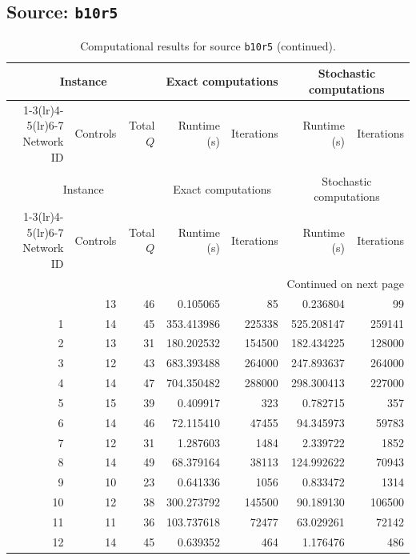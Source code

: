 \documentclass{article}
\begin{document}
\begin{landscape}
\subsection*{Source: \texttt{b10r5}}

\begin{longtable}{rrrrrrr}
\caption{Computational results for source \texttt{b10r5}.}\\
\toprule
\multicolumn{3}{c}{Instance} & \multicolumn{2}{c}{Exact computations} & \multicolumn{2}{c}{Stochastic computations} \\
\cmidrule(lr){1-3}\cmidrule(lr){4-5}\cmidrule(lr){6-7}
Network ID & Controls & Total $Q$ & Runtime (s) & Iterations & Runtime (s) & Iterations \\
\midrule
\endfirsthead
\caption[]{Computational results for source \texttt{b10r5} (continued).}\\
\toprule
\multicolumn{3}{c}{Instance} & \multicolumn{2}{c}{Exact computations} & \multicolumn{2}{c}{Stochastic computations} \\
\cmidrule(lr){1-3}\cmidrule(lr){4-5}\cmidrule(lr){6-7}
Network ID & Controls & Total $Q$ & Runtime (s) & Iterations & Runtime (s) & Iterations \\
\midrule
\endhead
\midrule
\multicolumn{7}{r}{Continued on next page} \\
\endfoot
\bottomrule
\endlastfoot
0 & 13 & 46 & 0.105065 & 85 & 0.236804 & 99 \\
1 & 14 & 45 & 353.413986 & 225338 & 525.208147 & 259141 \\
2 & 13 & 31 & 180.202532 & 154500 & 182.434225 & 128000 \\
3 & 12 & 43 & 683.393488 & 264000 & 247.893637 & 264000 \\
4 & 14 & 47 & 704.350482 & 288000 & 298.300413 & 227000 \\
5 & 15 & 39 & 0.409917 & 323 & 0.782715 & 357 \\
6 & 14 & 46 & 72.115410 & 47455 & 94.345973 & 59783 \\
7 & 12 & 31 & 1.287603 & 1484 & 2.339722 & 1852 \\
8 & 14 & 49 & 68.379164 & 38113 & 124.992622 & 70943 \\
9 & 10 & 23 & 0.641336 & 1056 & 0.833472 & 1314 \\
10 & 12 & 38 & 300.273792 & 145500 & 90.189130 & 106500 \\
11 & 11 & 36 & 103.737618 & 72477 & 63.029261 & 72142 \\
12 & 14 & 45 & 0.639352 & 464 & 1.176476 & 486 \\

\end{longtable}
\end{landscape}
\end{document}

